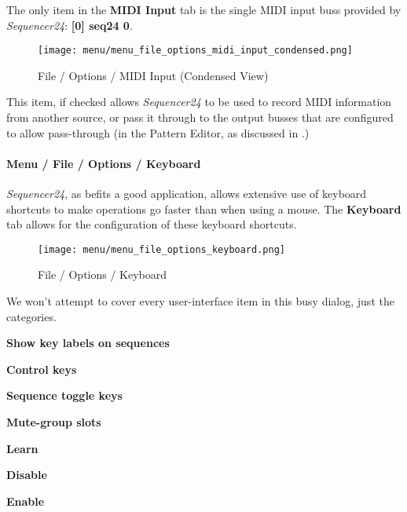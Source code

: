    The only item in the \textbf{MIDI Input} tab is the single MIDI input
   buss provided by \textsl{Sequencer24}:  \textbf{[0] seq24 0}.

\begin{figure}[H]
   \centering 
   \texttt{[image: menu/menu\_file\_options\_midi\_input\_condensed.png]}
   \caption{File / Options / MIDI Input (Condensed View)}
   \label{fig:seq24_menu_file_options_midi_input}
\end{figure}

   This item, if checked allows \textsl{Sequencer24} to be used to record MIDI
   information from another source, or pass it through to the output busses
   that are configured
   to allow pass-through
   (in the Pattern Editor, as discussed in 
   .)

\paragraph{Menu / File / Options / Keyboard }
\label{paragraph:seq24_menu_file_options_keyboard}

   \textsl{Sequencer24}, as befits a good application, allows extensive use of
   keyboard shortcuts to make operations go faster than when using a mouse.
   The \textbf{Keyboard} tab allows for the configuration of these keyboard
   shortcuts.

\begin{figure}[H]
   \centering 
   \texttt{[image: menu/menu\_file\_options\_keyboard.png]}
   \caption{File / Options / Keyboard}
   \label{fig:seq24_menu_file_options_keyboard}
\end{figure}

   We won't attempt to cover every user-interface item in this busy
   dialog, just the categories.

   \begin{enumber}
      \item \textbf{Show key labels on sequences}
      \item \textbf{Control keys}
      \item \textbf{Sequence toggle keys}
      \item \textbf{Mute-group slots}
      \item \textbf{Learn}
      \item \textbf{Disable}
      \item \textbf{Enable}
   \end{enumber}


